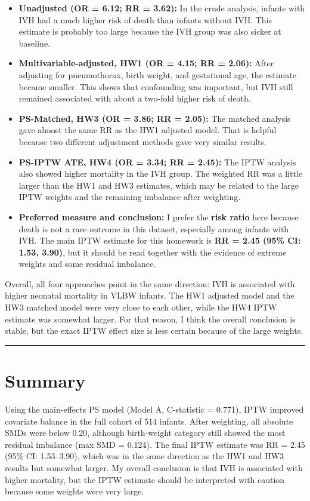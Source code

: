 \documentclass[
]{article}
\begin{document}
\begin{itemize}
\item
  \textbf{Unadjusted (OR = 6.12; RR = 3.62):} In the crude analysis,
  infants with IVH had a much higher risk of death than infants without
  IVH. This estimate is probably too large because the IVH group was
  also sicker at baseline.
\item
  \textbf{Multivariable-adjusted, HW1 (OR = 4.15; RR = 2.06):} After
  adjusting for pneumothorax, birth weight, and gestational age, the
  estimate became smaller. This shows that confounding was important,
  but IVH still remained associated with about a two-fold higher risk of
  death.
\item
  \textbf{PS-Matched, HW3 (OR = 3.86; RR = 2.05):} The matched analysis
  gave almost the same RR as the HW1 adjusted model. That is helpful
  because two different adjustment methods gave very similar results.
\item
  \textbf{PS-IPTW ATE, HW4 (OR = 3.34; RR = 2.45):} The IPTW analysis
  also showed higher mortality in the IVH group. The weighted RR was a
  little larger than the HW1 and HW3 estimates, which may be related to
  the large IPTW weights and the remaining imbalance after weighting.
\item
  \textbf{Preferred measure and conclusion:} I prefer the \textbf{risk
  ratio} here because death is not a rare outcome in this dataset,
  especially among infants with IVH. The main IPTW estimate for this
  homework is \textbf{RR = 2.45 (95\% CI: 1.53, 3.90)}, but it should be
  read together with the evidence of extreme weights and some residual
  imbalance.
\end{itemize}

Overall, all four approaches point in the same direction: IVH is
associated with higher neonatal mortality in VLBW infants. The HW1
adjusted model and the HW3 matched model were very close to each other,
while the HW4 IPTW estimate was somewhat larger. For that reason, I
think the overall conclusion is stable, but the exact IPTW effect size
is less certain because of the large weights.

\begin{center}\rule{0.5\linewidth}{0.5pt}\end{center}

\hypertarget{summary}{%
\section{Summary}\label{summary}}

Using the main-effects PS model (Model A, C-statistic = 0.771), IPTW
improved covariate balance in the full cohort of 514 infants. After
weighting, all absolute SMDs were below 0.20, although birth-weight
category still showed the most residual imbalance (max
\textbar SMD\textbar{} = 0.124). The final IPTW estimate was RR = 2.45
(95\% CI: 1.53--3.90), which was in the same direction as the HW1 and
HW3 results but somewhat larger. My overall conclusion is that IVH is
associated with higher mortality, but the IPTW estimate should be
interpreted with caution because some weights were very large.
\end{document}
